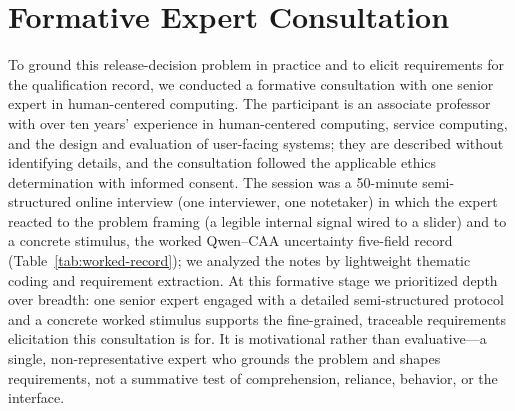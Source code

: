 \documentclass[manuscript,review,anonymous]{acmart}
\begin{document}
\section{Formative Expert Consultation}\label{formative-study}

To ground this release-decision problem in practice and to elicit requirements for the qualification record, we conducted a formative consultation with one senior expert in human-centered computing. The participant is an associate professor with over ten years' experience in human-centered computing, service computing, and the design and evaluation of user-facing systems; they are described without identifying details, and the consultation followed the applicable ethics determination with informed consent. The session was a 50-minute semi-structured online interview (one interviewer, one notetaker) in which the expert reacted to the problem framing (a legible internal signal wired to a slider) and to a concrete stimulus, the worked Qwen--CAA uncertainty five-field record (Table~\ref{tab:worked-record}); we analyzed the notes by lightweight thematic coding and requirement extraction. At this formative stage we prioritized depth over breadth: one senior expert engaged with a detailed semi-structured protocol and a concrete worked stimulus supports the fine-grained, traceable requirements elicitation this consultation is for. It is motivational rather than evaluative---a single, non-representative expert who grounds the problem and shapes requirements, not a summative test of comprehension, reliance, behavior, or the interface.
\end{document}
